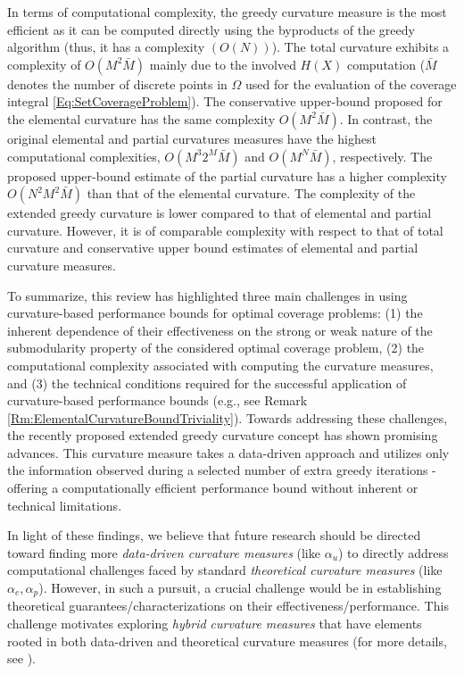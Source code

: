 \documentclass[letterpaper, 10 pt, conference]{ieeeconf}
\begin{document}
In terms of computational complexity, the greedy curvature measure is the most efficient as it can be computed directly using the byproducts of the greedy algorithm (thus, it has a complexity $(O(N))$).
The total curvature exhibits a complexity of $O(M^2\bar{M})$ mainly due to the involved $H(X)$ computation ($\bar{M}$ denotes the number of discrete points in $\Omega$ used for the evaluation of the coverage integral \eqref{Eq:SetCoverageProblem}). The conservative upper-bound proposed for the  elemental curvature has the same complexity $O(M^2\bar{M})$. In contrast, the original elemental and partial curvatures measures have the highest computational complexities, $O(M^3 2^M \bar{M})$ and $O(M^N\bar{M})$, respectively. The proposed upper-bound estimate of the partial curvature has a higher complexity \(O(N^2 M^2 \bar{M})\) than that of the elemental curvature. The complexity of the extended greedy curvature is lower compared to that of elemental and partial curvature. However, it is of comparable complexity with respect to that of total curvature and conservative upper bound estimates of elemental and partial curvature measures. 


To summarize, this review has highlighted three main challenges in using curvature-based performance bounds for optimal coverage problems: 
(1) the inherent dependence of their effectiveness on the strong or weak nature of the submodularity property of the considered optimal coverage problem,  
(2) the computational complexity associated with computing the curvature measures, and 
(3) the technical conditions required for the successful application of curvature-based performance bounds (e.g., see Remark \ref{Rm:ElementalCurvatureBoundTriviality}). Towards addressing these challenges, the recently proposed extended greedy curvature concept \cite{WelikalaJ02021} has shown promising advances. This curvature measure takes a data-driven approach and utilizes only the information observed during a selected number of extra greedy iterations - offering a computationally efficient performance bound without inherent or technical limitations. 

In light of these findings, we believe that future research should be directed toward finding more \emph{data-driven curvature measures} (like $\alpha_u$) to directly address computational challenges faced by standard \emph{theoretical curvature measures} (like $\alpha_e,\alpha_p$). However, in such a pursuit, a crucial challenge would be in establishing  theoretical guarantees/characterizations on their effectiveness/performance. This challenge motivates exploring \emph{hybrid curvature measures} that have elements rooted in both data-driven and theoretical curvature measures (for more details, see \cite{Welikala2024Ax1}). 
\end{document}
